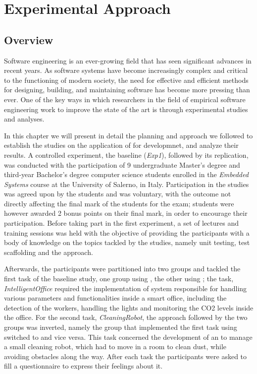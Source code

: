 \chapter{Experimental Approach}
\section{Overview}
Software engineering is an ever-growing field that has seen significant advances in recent years. As software systems have become increasingly complex and critical to the functioning of modern society, the need for effective and efficient methods for designing, building, and maintaining software has become more pressing than ever. One of the key ways in which researchers in the field of empirical software engineering work to improve the state of the art is through experimental studies and analyses.

In this chapter we will present in detail the planning and approach we followed to establish the studies on the application of \tdd for \es developmnet, and analyze their results. 
A controlled experiment, the baseline (\textit{Exp1}), followed by its replication, was conducted with the participation of 9 undergraduate Master's degree and third-year Bachelor's degree computer science students enrolled in the \textit{Embedded Systems} course at the University of Salerno, in Italy. Participation in the studies was agreed upon by the students and was voluntary, with the outcome not directly affecting the final mark of the students for the exam; students were however awarded 2 bonus points on their final mark, in order to encourage their participation.
Before taking part in the first experiment, a set of lectures and training sessions was held with the objective of providing the participants with a body of knowledge on the topics tackled by the studies, namely unit testing, test scaffolding and the \tdd approach.

Afterwards, the participants were partitioned into two groups and tackled the first task of the baseline study, one group using \tdd, the other using \notdd; the task, \textit{IntelligentOffice} required the implementation of system responsible for handling various parameters and functionalities inside a smart office, including the detection of the workers, handling the lights and monitoring the CO2 levels inside the office.
For the second task, \textit{CleaningRobot}, the approach followed by the two groups was inverted, namely the group that implemented the first task using \tdd switched to \notdd and vice versa. This task concerned the development of an \es to manage a small cleaning robot, which had to move in a room to clean dust, while avoiding obstacles along the way.
After each task the participants were asked to fill a questionnaire to express their feelings about it.

